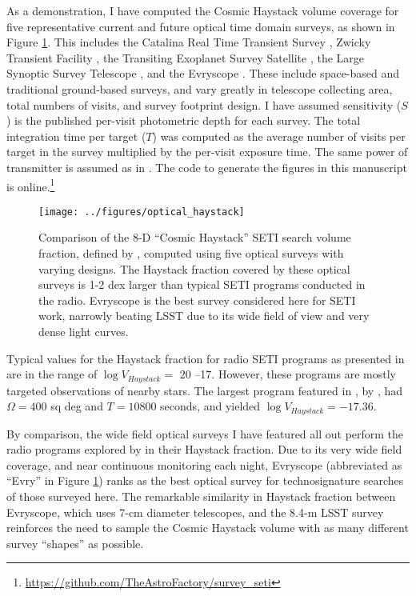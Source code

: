 \documentclass[twocolumn]{aastex62}
\newcommand{\TESS}{\textsl{TESS}\xspace}
\begin{document}
As a demonstration, I have computed the Cosmic Haystack volume coverage for five representative current and future optical time domain surveys, as shown in Figure \ref{fig:hay}. This includes the Catalina Real Time Transient Survey \citep[CRTS;][]{catalina}, Zwicky Transient Facility \citep[ZTF;][]{bellm2014}, the Transiting Exoplanet Survey Satellite \citep[\TESS;][]{tess}, the Large Synoptic Survey Telescope \citep[LSST;][]{lsst}, and the Evryscope \citep{law2015}. These include space-based and traditional ground-based surveys, and vary greatly in telescope collecting area, total numbers of visits, and survey footprint design. 
I have assumed sensitivity ($S$) is the published per-visit photometric depth for each survey. The total integration time per target ($T$) was computed as the average number of visits per target in the survey multiplied by the per-visit exposure time. The same power of transmitter is assumed as in \citet{wright2018c}. 
The code to generate the figures in this manuscript is online.\footnote{\url{https://github.com/TheAstroFactory/survey_seti}}


\begin{figure}[]
\centering
\texttt{[image: ../figures/optical\_haystack]}
\caption{
Comparison of the 8-D ``Cosmic Haystack'' SETI search volume fraction, defined by \citet{wright2018c}, computed using five optical surveys with varying designs. The Haystack fraction covered by these optical surveys is 1-2 dex larger than typical SETI programs conducted in the radio.
Evryscope \citet{law2015} is the best survey considered here for SETI work, narrowly beating LSST due to its wide field of view and very dense light curves.}
\label{fig:hay}
\end{figure}


Typical values for the Haystack fraction for radio SETI programs as presented in \citet{wright2018c}  are in the range of $\log V_{Haystack} = $ 20 --17. However, these programs are mostly targeted observations of nearby stars. The largest program featured in \citet{wright2018c}, by \citet{tingay2018}, had $\Omega=400$ sq deg and $T=10800$ seconds, and yielded $\log V_{Haystack} =  -17.36$.

By comparison, the wide field optical surveys I have featured all out perform the radio programs explored by \citet{wright2018c} in their Haystack fraction.
Due to its very wide field coverage, and near continuous monitoring each night, Evryscope (abbreviated as ``Evry'' in Figure \ref{fig:hay}) ranks as the best optical survey for technosignature searches of those surveyed here. The remarkable similarity in Haystack fraction between Evryscope, which uses 7-cm diameter telescopes, and the 8.4-m LSST survey reinforces the need to sample the Cosmic Haystack volume with as many different survey ``shapes'' as possible.
\end{document}
